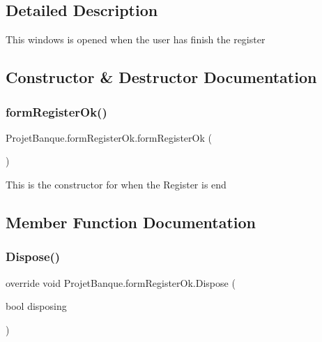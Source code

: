 \subsection{Detailed Description}
This windows is opened when the user has finish the register 



\subsection{Constructor \& Destructor Documentation}
\mbox{\label{class_projet_banque_1_1form_register_ok_a5714d1a5b568d1667927d0908b53bfde}} 
\subsubsection{\texorpdfstring{formRegisterOk()}{formRegisterOk()}}
{\footnotesize\ttfamily Projet\+Banque.\+form\+Register\+Ok.\+form\+Register\+Ok (\begin{DoxyParamCaption}{ }\end{DoxyParamCaption})}



This is the constructor for when the Register is end 



\subsection{Member Function Documentation}
\mbox{\label{class_projet_banque_1_1form_register_ok_ac7fc952554f8e22d1b45017ea851cb9a}} 
\subsubsection{\texorpdfstring{Dispose()}{Dispose()}}
{\footnotesize\ttfamily override void Projet\+Banque.\+form\+Register\+Ok.\+Dispose (\begin{DoxyParamCaption}\item[{bool}]{disposing }\end{DoxyParamCaption})\hspace{0.3cm}{\ttfamily [protected]}}



